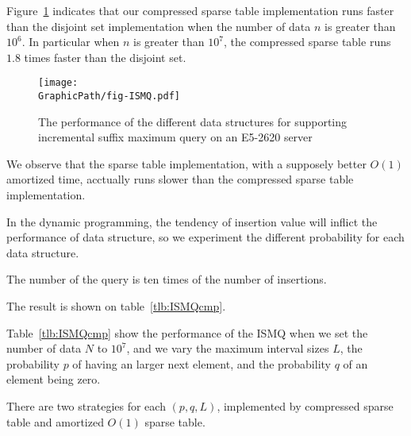 \iffalse
\begin{itemize}
  \item 并查集 (Disjoint Set): 平均運行時間 $o(\alpha(n))$。只使用路徑壓縮技巧。
  \item 稀疏表 (Sparse Table): 插入 $O(\log n)$、詢問 $O(1)$。實作陣列宣告採用 $\tt{table}[\log N][N]$ 以減少快取未中。
  \item 樹狀數組 (Binary Indexed Tree): 插入、詢問均為 $O(\log n)$。
  \item 壓縮稀疏表 (Compressed Sparse Tree): 插入均攤 $O(1)$、詢問操作 $O(s)$，
  其中 $s$ 為拆分到區塊大小。實作時，維護區塊前綴和後綴最大值降低詢問複雜度至 $O(1)$，當發生 in-block 詢問再運行 $O(s)$ 算法。
\end{itemize}
\fi

Figure~\ref{fig:fig-ISMQcmp} indicates that our compressed sparse
table implementation runs faster than the disjoint set implementation
when the number of data $n$ is greater than $10^6$.  In particular
when $n$ is greater than $10^7$, the compressed sparse table runs
$1.8$ times faster than the disjoint set.

\begin{figure}[!thb]
  \centering
  \texttt{[image: \\GraphicPath/fig-ISMQ.pdf]}
  \caption{The performance of the different data structures for
    supporting incremental suffix maximum query on an E5-2620 server}
  \label{fig:fig-ISMQcmp}
\end{figure}


We observe that the sparse table implementation, with a supposely
better $O(1)$ amortized time, acctually runs slower than the
compressed sparse table implementation.

In the dynamic programming, the tendency of insertion value will
inflict the performance of data structure, so we experiment the
different probability for each data structure.

The number of the query is ten times of the number of insertions.

The result is shown on table~\ref{tlb:ISMQcmp}.

Table~\ref{tlb:ISMQcmp} show the performance of the ISMQ when we set
the number of data $N$ to $10^7$, and we vary the maximum interval
sizes $L$, the probability $p$ of having an larger next element, and
the probability $q$ of an element being zero.

There are two strategies for each $(p, q, L)$, implemented by
compressed sparse table and amortized $O(1)$ sparse table.


